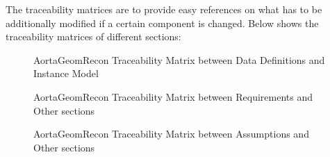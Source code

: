 \begin{itemize}
The traceability matrices are to provide easy references on what has to be additionally modified if a certain component is changed. Below shows the traceability matrices of different sections:
\begin{figure}[H]
    \centering
    \caption[AortaGeomRecon Traceability Matrix between Data Definitions and Instance Model]{AortaGeomRecon Traceability Matrix between Data Definitions and Instance Model}
    \label{fig_agr_tm_dd_im}
\end{figure}

\begin{figure}[H]
    \centering
    \caption[AortaGeomRecon Traceability Matrix between Requirements and Other sections]{AortaGeomRecon Traceability Matrix between Requirements and Other sections}
    \label{fig_agr_tm_im_r}
\end{figure}

\begin{figure}[H]
    \centering
    \caption[AortaGeomRecon Traceability Matrix between Assumptions and Other sections]{AortaGeomRecon Traceability Matrix between Assumptions and Other sections}
    \label{fig_agr_tm_a}
\end{figure}


\end{itemize}

